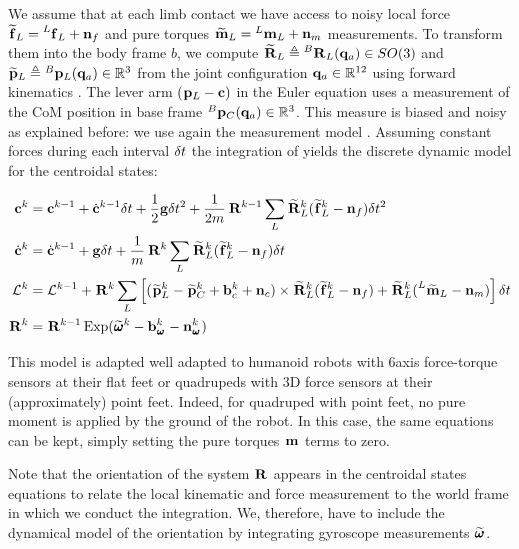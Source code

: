 We assume that at each limb contact we have access to noisy local force $\prescript{}{}{\widetilde{{\bf f}}}_{L} = \prescript{L}{}{{\bf f}}_{L} + {\bf n}_f$ and pure torques 
$\prescript{}{}{\widetilde{\bf m}}_{L} = \prescript{L}{}{\bf m}_{L} + {\bf n}_m$ measurements. 
To transform them into the body frame $b$, we compute $\prescript{}{}{\widetilde{{\bf R}}}_{L} \triangleq \prescript{B}{}{{\bf R}}_{L}({\bf q}_a)  \in SO(3)$ and $\prescript{}{}{\widetilde{{\bf p}}}_{L} \triangleq \prescript{B}{}{{\bf p}}_{L}({\bf q}_a) \in \mathbb{R}^3 $ 
from the joint configuration ${\bf q}_a  \in \mathbb{R}^{12}$ using forward kinematics . 
The lever arm $(\prescript{}{}{{\bf p}}_{L} - {\bf c})$ in the Euler equation  uses a measurement of the CoM position in base frame $ \prescript{B}{}{{\bf p}}_{C}({\bf q}_a) \in \mathbb{R}^3$. 
This measure is biased and noisy as explained before: we use again the measurement model .
Assuming constant forces during each interval $\delta t$ the integration of  yields the discrete dynamic model for the centroidal states:


\begin{equation}
    \begin{split}
        {\bf c}^{k} &= {\bf c}^{k-1} + \dot{{\bf c}}^{k-1} \delta t+\frac{1}{2} {\bf g} \delta t^2 + \frac{1}{2m} \prescript{}{}{{\bf R}}_{}^{k-1} \sum_L \prescript{}{}{\widetilde{{\bf R}}}_{L}^k (\prescript{}{}{\widetilde{{\bf f}}}_{L}^k - {\bf n}_{f}) \delta t^2
        \\
        \dot{{\bf c}}^{k}&= \dot{{\bf c}}^{k-1} + {\bf g} \delta t + \frac{1}{m} \prescript{}{}{{\bf R}}_{}^k \sum_L\prescript{}{}{\widetilde{{\bf R}}}_{L}^k (\prescript{}{}{\widetilde{{\bf f}}}_{L}^k - {\bf n}_{f}) \delta t 
        \\
        \mathcal{L}^{k} &= \mathcal{L}^{k-1} +\prescript{}{}{{\bf R}}_{}^k \sum_L \left[ (\prescript{}{}{\widetilde{{\bf p}}}_{L}^k  - \prescript{}{}{\widetilde{{\bf p}}}_{C}^k +  {\bf b}_{c}^k + {\bf n}_{c}) \times \prescript{}{}{\widetilde{{\bf R}}}_{L}^k(\prescript{}{}{\widetilde{{\bf f}}}_{L}^k - {\bf n}_{f}) 
                                                        + \prescript{}{}{\widetilde{{\bf R}}}_{L}^k(\prescript{L}{}{\widetilde{\bf m}}_{L} - {\bf n}_m)\right]\delta t
        \\
        \prescript{}{}{{\bf R}}_{}^k &= \prescript{}{}{{\bf R}}_{}^{k-1}\operatorname*{Exp}(\prescript{}{}{\widetilde{\pmb{\omega}}}_{}^k - {\bf b}_{\prescript{}{}{\pmb{\omega}}_{}}^k - {\bf n}_{\prescript{}{}{\pmb{\omega}}_{}}^k)
    \end{split}
    \label{eq:COMDiscrete}
\end{equation}

This model is adapted well adapted to humanoid robots with 6axis force-torque sensors at their flat feet or quadrupeds with 3D force sensors at their (approximately) 
point feet. Indeed, for quadruped with point feet, no pure moment is applied by the ground of the robot. In this case, the same equations can be kept, simply setting the
pure torques  $\prescript{}{}{\bf m}_{}$ terms to zero.

Note that the orientation of the system $\prescript{}{}{{\bf R}}_{}$ appears in the centroidal states equations to relate the local kinematic and force measurement to the world frame in
which we conduct the integration. We, therefore, have to include the dynamical model of the orientation by integrating gyroscope measurements $\prescript{}{}{\widetilde{\pmb{\omega}}}_{}$. 

